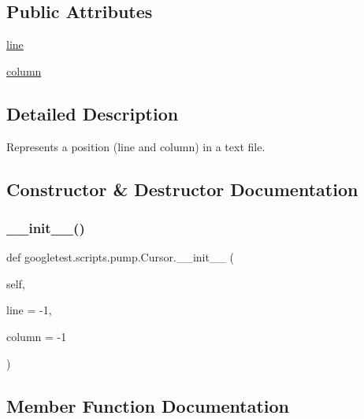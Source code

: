 \subsection*{Public Attributes}
\begin{DoxyCompactItemize}
\item 
\mbox{\hyperlink{classgoogletest_1_1scripts_1_1pump_1_1_cursor_ac5ea3e3272777d4798d4a3d6a963181b}{line}}
\item 
\mbox{\hyperlink{classgoogletest_1_1scripts_1_1pump_1_1_cursor_ab54c274e7622e7a9a88adb63219be144}{column}}
\end{DoxyCompactItemize}


\subsection{Detailed Description}
\begin{DoxyVerb}Represents a position (line and column) in a text file.\end{DoxyVerb}
 

\subsection{Constructor \& Destructor Documentation}
\mbox{\label{classgoogletest_1_1scripts_1_1pump_1_1_cursor_a861445c418144ddc5a18a18d92f58b54}} 
\subsubsection{\texorpdfstring{\_\_init\_\_()}{\_\_init\_\_()}}
{\footnotesize\ttfamily def googletest.\+scripts.\+pump.\+Cursor.\+\_\+\+\_\+init\+\_\+\+\_\+ (\begin{DoxyParamCaption}\item[{}]{self,  }\item[{}]{line = {\ttfamily -\/1},  }\item[{}]{column = {\ttfamily -\/1} }\end{DoxyParamCaption})}



\subsection{Member Function Documentation}
\mbox{\label{classgoogletest_1_1scripts_1_1pump_1_1_cursor_a3161620cbb21055fc6943f7d50eca92e}} 
